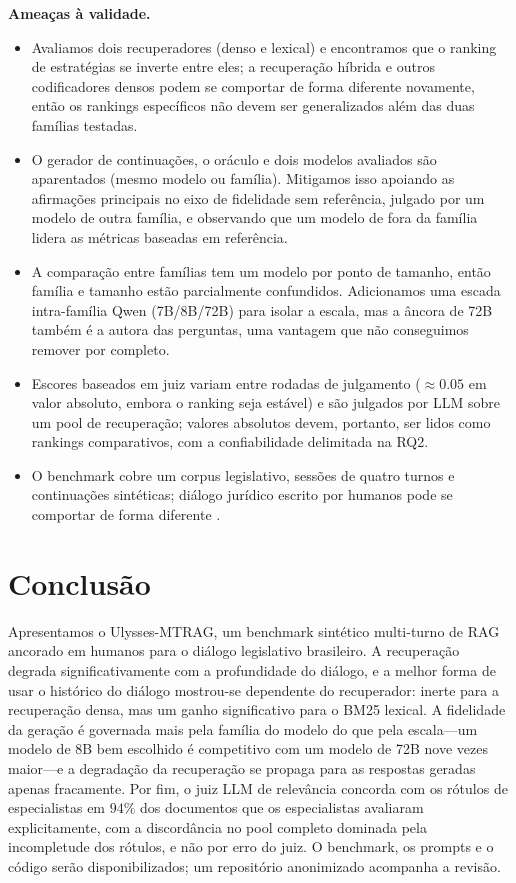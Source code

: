 \documentclass[conference]{IEEEtran}
\begin{document}
\textbf{Ameaças à validade.}
\begin{itemize}
  \item[(i)] Avaliamos dois recuperadores (denso e lexical) e encontramos que
  o ranking de estratégias se inverte entre eles; a recuperação híbrida e
  outros codificadores densos podem se comportar de forma diferente novamente,
  então os rankings específicos não devem ser generalizados além das duas
  famílias testadas.
  \item[(ii)] O gerador de continuações, o oráculo e dois modelos avaliados
  são aparentados (mesmo modelo ou família). Mitigamos isso apoiando as
  afirmações principais no eixo de fidelidade sem referência, julgado por um
  modelo de outra família, e observando que um modelo de fora da família
  lidera as métricas baseadas em referência.
  \item[(iii)] A comparação entre famílias tem um modelo por ponto de
  tamanho, então família e tamanho estão parcialmente confundidos.
  Adicionamos uma escada intra-família Qwen (7B/8B/72B) para isolar a escala,
  mas a âncora de 72B também é a autora das perguntas, uma vantagem que não
  conseguimos remover por completo.
  \item[(iv)] Escores baseados em juiz variam entre rodadas de julgamento
  ($\approx0.05$ em valor absoluto, embora o ranking seja estável) e são
  julgados por LLM sobre um pool de recuperação; valores absolutos devem,
  portanto, ser lidos como rankings comparativos, com a confiabilidade
  delimitada na RQ2.
  \item[(v)] O benchmark cobre um corpus legislativo, sessões de quatro
  turnos e continuações sintéticas; diálogo jurídico escrito por humanos pode
  se comportar de forma diferente \cite{Qu2020ORConvQA}.
\end{itemize}

\section{Conclusão}
Apresentamos o Ulysses-MTRAG, um benchmark sintético multi-turno de RAG
ancorado em humanos para o diálogo legislativo brasileiro. A recuperação
degrada significativamente com a profundidade do diálogo, e a melhor forma de
usar o histórico do diálogo mostrou-se dependente do recuperador: inerte para
a recuperação densa, mas um ganho significativo para o BM25 lexical. A
fidelidade da geração é governada mais pela família do modelo do que pela
escala---um modelo de 8B bem escolhido é competitivo com um modelo de 72B nove
vezes maior---e a degradação da recuperação se propaga para as respostas
geradas apenas fracamente. Por fim, o juiz LLM de relevância concorda com os
rótulos de especialistas em $94\%$ dos documentos que os especialistas
avaliaram explicitamente, com a discordância no pool completo dominada pela
incompletude dos rótulos, e não por erro do juiz. O benchmark, os prompts e o
código serão disponibilizados; um repositório anonimizado acompanha a revisão.



\end{document}
